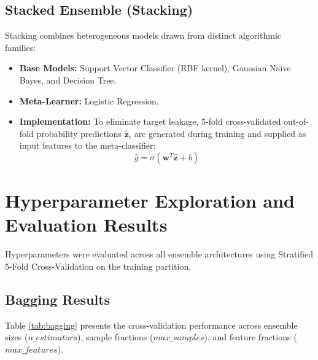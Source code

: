 \documentclass[12pt,a4paper]{article}
\begin{document}
\subsection{Stacked Ensemble (Stacking)}
Stacking combines heterogeneous models drawn from distinct algorithmic families:
\begin{itemize}
\item \textbf{Base Models:} Support Vector Classifier (RBF kernel), Gaussian Na\"\i ve Bayes, and Decision Tree.
\item \textbf{Meta-Learner:} Logistic Regression.
\item \textbf{Implementation:} To eliminate target leakage, 5-fold cross-validated out-of-fold probability predictions $\hat{\mathbf{z}}_i$ are generated during training and supplied as input features to the meta-classifier:
\begin{equation}
\hat{y} = \sigma\left(\mathbf{w}^T \hat{\mathbf{z}} + b\right)
\end{equation}
\end{itemize}

\section{Hyperparameter Exploration and Evaluation Results}
Hyperparameters were evaluated across all ensemble architectures using Stratified 5-Fold Cross-Validation on the training partition.

\subsection{Bagging Results}
Table \ref{tab:bagging} presents the cross-validation performance across ensemble sizes ($n\_estimators$), sample fractions ($max\_samples$), and feature fractions ($max\_features$).
\end{document}
